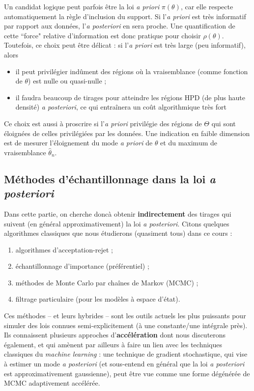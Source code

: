 Un candidat logique peut parfois être la loi {\it a priori} $\pi(\theta)$, car elle respecte automatiquement la règle d'inclusion du support. Si l'{\it a priori} est très informatif par rapport aux données, l'{\it a posteriori} en sera proche. Une quantification de cette ``force" relative d'information est donc pratique pour choisir $\rho(\theta)$. Toutefois, ce choix peut être délicat : si l'{\it a priori} est très large (peu informatif), alors 
\begin{itemize}
\item il peut privilégier indûment des régions où la vraisemblance (comme fonction de $\theta$) est nulle ou quasi-nulle ;
\item  il faudra beaucoup de tirages pour atteindre les régions HPD (de plus haute densité) {\it a posteriori},  ce qui entraînera un  {coût algorithmique très fort}
\end{itemize}
Ce choix est aussi à proscrire si l'{\it a priori} privilégie des régions de $\Theta$ qui sont éloignées de celles privilégiées par les données. Une indication en faible dimension est de mesurer l'éloignement du mode {\it a priori} de $\theta$ et du maximum de vraisemblance $\hat{\theta}_n$. \\

\subsection{Méthodes d'échantillonnage dans la loi {\it a posteriori}}

Dans cette partie, on cherche doncà obtenir {\bf indirectement} des tirages qui suivent (en général approximativement) 
la loi {\it a posteriori}. Citons quelques algorithmes classiques que nous étudierons (quasiment tous) dans ce cours :
\begin{enumerate}
\item  algorithmes d'acceptation-rejet ;
\item  échantillonnage d'importance (préférentiel) ; 
\item  méthodes de Monte Carlo par chaînes de Markov (MCMC) ; 
\item  filtrage particulaire (pour les modèles à espace d'état).
\end{enumerate}
Ces méthodes  -- et leurs hybrides  -- sont les outils actuels les plus puissants pour simuler des lois connues semi-explicitement (à une constante/une intégrale près). Ils connaissent plusieurs approches d'\textbf{accélération} dont nous discuterons également, et qui amènent par ailleurs à faire un lien avec les techniques classiques du \emph{machine learning} : une technique de gradient stochastique, qui vise à estimer un mode {\it a posteriori} (et sous-entend en général que la loi {\it a posteriori} est approximativement gaussienne), peut être vue comme une forme dégénérée de MCMC adaptivement accélérée. \\

